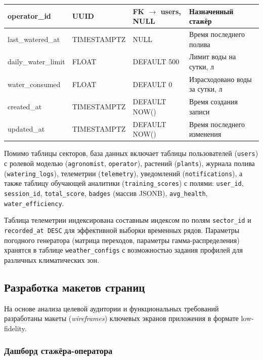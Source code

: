 \begin{longtable}{|I{3.0cm}|p{3.5cm}|R{3.0cm}|R{4.8cm}|}
	operator\_id         & UUID              & FK $\to$ users, NULL    & Назначенный стажёр                 \\ \hline
	last\_watered\_at    & TIMESTAMPTZ       & NULL                    & Время последнего полива            \\ \hline
	daily\_water\_limit  & FLOAT             & DEFAULT 500             & Лимит воды на сутки, л             \\ \hline
	water\_consumed      & FLOAT             & DEFAULT 0               & Израсходовано воды за сутки, л     \\ \hline
	created\_at          & TIMESTAMPTZ       & DEFAULT NOW()           & Время создания записи              \\ \hline
	updated\_at          & TIMESTAMPTZ       & DEFAULT NOW()           & Время последнего изменения         \\ \hline
\end{longtable}

Помимо таблицы секторов, база данных включает таблицы пользователей
(\texttt{users}) с ролевой моделью (\texttt{agronomist},
\texttt{operator}), растений (\texttt{plants}), журнала полива
(\texttt{watering\_logs}), телеметрии (\texttt{telemetry}),
уведомлений (\texttt{notifications}), а также таблицу обучающей
аналитики (\texttt{training\_scores}) с полями: \texttt{user\_id},
\texttt{session\_id}, \texttt{total\_score}, \texttt{badges}
(массив JSONB), \texttt{avg\_health}, \texttt{water\_efficiency}.

Таблица телеметрии индексирована составным индексом по полям
\texttt{sector\_id} и \texttt{recorded\_at~DESC} для эффективной
выборки временных рядов. Параметры погодного генератора
(матрица переходов, параметры гамма-распределения) хранятся в
таблице \texttt{weather\_configs} с возможностью задания профилей
для различных климатических зон.


\subsection{Разработка макетов страниц}

На основе анализа целевой аудитории и функциональных требований
разработаны макеты (\emph{wireframes}) ключевых экранов
приложения в формате low-fidelity.

\subsubsection{Дашборд стажёра-оператора}

